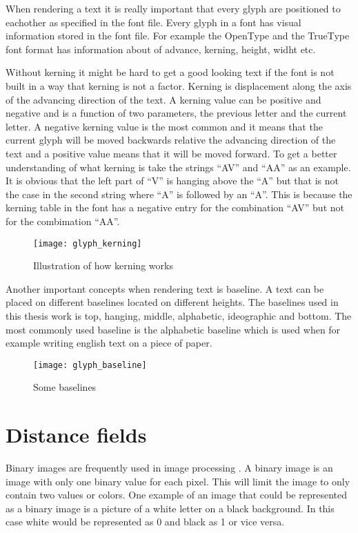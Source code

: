 When rendering a text it is really important that every glyph are positioned to eachother as specified in the font file. Every glyph in a font has visual information stored in the font file. For example the OpenType and the TrueType\texttrademark{} font format has information about of advance, kerning, height, widht etc\citep{OpenType, TrueType}.

Without kerning it might be hard to get a good looking text if the font is not built in a way that kerning is not a factor. Kerning is displacement along the axis of the advancing direction of the text. A kerning value can be positive and negative and is a function of two parameters, the previous letter and the current letter. A negative kerning value is the most common and it means that the current glyph will be moved backwards relative the advancing direction of the text and a positive value means that it will be moved forward. To get a better understanding of what kerning is take the strings ``AV'' and ``AA'' as an example. It is obvious that the left part of ``V'' is hanging above the ``A'' but that is not the case in the second string where ``A'' is followed by an ``A''. This is because the kerning table in the font has a negative entry for the combination ``AV'' but not for the combimation ``AA''. \citep{FreeTypeKern}

\begin{figure}[H]
\texttt{[image: glyph\_kerning]}
\caption{Illustration of how kerning works}
\end{figure}

Another important concepts when rendering text is baseline. A text can be placed on different baselines located on different heights. The baselines used in this thesis work is top, hanging, middle, alphabetic, ideographic and bottom. The most commonly used baseline is the alphabetic baseline which is used when for example writing english text on a piece of paper.

\begin{figure}[H]
\texttt{[image: glyph\_baseline]}
\caption{Some baselines}
\end{figure}

\section{Distance fields}\label{distancefield}
Binary images are frequently used in image processing \citep{Ragnemalm:1993}. A binary image is an image with only one binary value for each pixel. This will limit the image to only contain two values or colors. One example of an image that could be represented as a binary image is a picture of a white letter on a black background. In this case white would be represented as 0 and black as 1 or vice versa.

